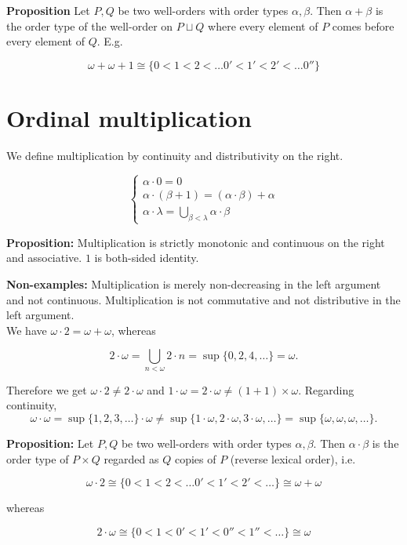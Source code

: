 \textbf{Proposition} Let $P,Q$ be two well-orders with order types $\alpha,\beta$. Then $\alpha+\beta$ is the order type of the well-order on $P \sqcup Q$ where every element of $P$ comes before every element of $Q$. E.g.

\[ \omega + \omega + 1 \cong \{ 0 < 1 < 2 < \ldots 0' < 1' < 2' < \ldots 0'' \} \]

\section{Ordinal multiplication}
We define multiplication by continuity and distributivity on the right.

\[ 
\begin{cases}
	\alpha \cdot 0 = 0 \\
	\alpha \cdot (\beta + 1) = (\alpha \cdot \beta) + \alpha \\
	\alpha \cdot \lambda = \bigcup_{\beta < \lambda} \alpha \cdot \beta
\end{cases}
\]

\textbf{Proposition: } Multiplication is strictly monotonic and continuous on the right and associative. $1$ is both-sided identity.

\textbf{Non-examples: } Multiplication is merely non-decreasing in the left argument and not continuous. Multiplication is not commutative and not distributive in the left argument. \\

We have $\omega \cdot 2 = \omega + \omega$, whereas

\[ 2 \cdot \omega = \bigcup_{n<\omega} 2\cdot n = \sup \{ 0, 2, 4, \ldots \} = \omega. \]

Therefore we get $\omega \cdot 2 \neq 2 \cdot \omega$ and $1\cdot \omega = 2\cdot \omega \neq (1+1)\times \omega$. Regarding continuity, 
\[ \omega \cdot \omega = \sup \{ 1, 2, 3, \ldots \} \cdot \omega \neq \sup \{ 1 \cdot \omega, 2 \cdot \omega, 3 \cdot \omega, \ldots \} = \sup \{ \omega, \omega, \omega, \ldots \}. \]

\textbf{Proposition: } Let $P,Q$ be two well-orders with order types $\alpha,\beta$. Then $\alpha \cdot \beta$ is the order type of $P \times Q$ regarded as $Q$ copies of $P$ (reverse lexical order), i.e.

\[ \omega\cdot 2 \cong \{ 0 < 1 < 2 < \ldots 0' < 1' < 2' < \ldots \} \cong \omega + \omega \]

whereas

\[ 2 \cdot \omega \cong \{ 0 < 1 < 0' < 1' < 0'' < 1'' < \ldots \} \cong \omega \]

